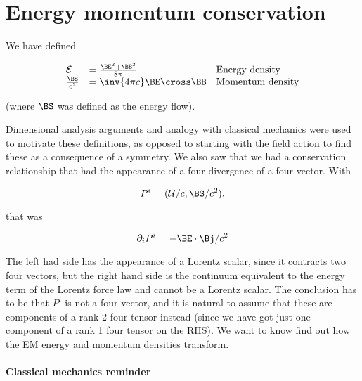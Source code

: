 %
%
\section{Energy momentum conservation}

We have defined

\begin{equation}\label{eqn:relativisticElectrodynamicsL21b:320}
\begin{array}{l l l}
\mathcal{E} &= \frac{\BE^2 + \BB^2}{8\pi} & \mbox{Energy density} \\
\frac{\BS}{c^2} &= \inv{4 \pi c} \BE \cross \BB & \mbox{Momentum density}
\end{array}
\end{equation}

(where $\BS$ was defined as the energy flow).

Dimensional analysis arguments and analogy with classical mechanics were used to motivate these definitions, as opposed to starting with the field action to find these as a consequence of a symmetry.  We also saw that we had a conservation relationship that had the appearance of a four divergence of a four vector.  With

\begin{equation}\label{eqn:relativisticElectrodynamicsL21b:340}
P^i = (\mathcal{U}/c, \BS/c^2),
\end{equation}

that was

\begin{equation}\label{eqn:relativisticElectrodynamicsL21b:360}
\partial_i P^i = - \BE \cdot \Bj/c^2
\end{equation}

The left had side has the appearance of a Lorentz scalar, since it contracts two four vectors, but the right hand side is the continuum equivalent to the energy term of the Lorentz force law and cannot be a Lorentz scalar.  The conclusion has to be that $P^i$ is not a four vector, and it is natural to assume that these are components of a rank 2 four tensor instead (since we have got just one component of a rank 1 four tensor on the RHS).  We want to know find out how the EM energy and momentum densities transform.

\paragraph{Classical mechanics reminder}

